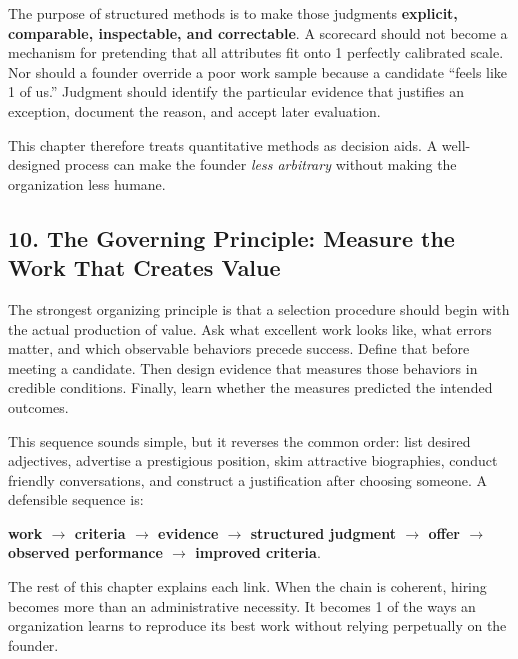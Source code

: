 The purpose of structured methods is to make those judgments \textbf{explicit, comparable, inspectable, and correctable}. A scorecard should not become a mechanism for pretending that all attributes fit onto 1 perfectly calibrated scale. Nor should a founder override a poor work sample because a candidate ``feels like 1 of us.'' Judgment should identify the particular evidence that justifies an exception, document the reason, and accept later evaluation.

This chapter therefore treats quantitative methods as decision aids. A well-designed process can make the founder \textit{less arbitrary} without making the organization less humane.

\subsection*{10. The Governing Principle: Measure the Work That Creates Value}

The strongest organizing principle is that a selection procedure should begin with the actual production of value. Ask what excellent work looks like, what errors matter, and which observable behaviors precede success. Define that before meeting a candidate. Then design evidence that measures those behaviors in credible conditions. Finally, learn whether the measures predicted the intended outcomes.

This sequence sounds simple, but it reverses the common order: list desired adjectives, advertise a prestigious position, skim attractive biographies, conduct friendly conversations, and construct a justification after choosing someone. A defensible sequence is:
\begin{center}
\textbf{work $\to$ criteria $\to$ evidence $\to$ structured judgment $\to$ offer $\to$ observed performance $\to$ improved criteria}.
\end{center}

The rest of this chapter explains each link. When the chain is coherent, hiring becomes more than an administrative necessity. It becomes 1 of the ways an organization learns to reproduce its best work without relying perpetually on the founder.
